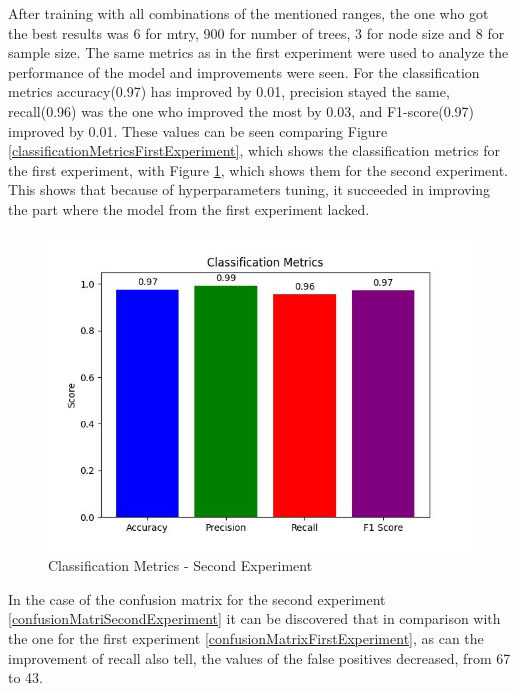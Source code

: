 After training with all combinations of the mentioned ranges, the one who got the best results was 6 for mtry, 900 for number of trees, 3 for node size and 8 for sample size. The same metrics as in the first experiment were used to analyze the performance of the model and improvements were seen. For the classification metrics accuracy(0.97) has improved by 0.01, precision stayed the same, recall(0.96) was the one who improved the most by 0.03, and F1-score(0.97) improved by 0.01. These values can be seen comparing Figure \ref{classificationMetricsFirstExperiment}, which shows the classification metrics for the first experiment, with Figure \ref{classificationMetricsSecondExperiment}, which shows them for the second experiment. This shows that because of hyperparameters tuning, it succeeded in improving the part where the model from the first experiment lacked.

\begin{figure}[htbp]
	\centering
		\includegraphics[scale=0.8]{LaTeX Bachelor Thesis Depression Signs Detection/figures/metrics/experiment2English/classificationMetrics.jpg}
	\caption{Classification Metrics - Second Experiment}
	\label{classificationMetricsSecondExperiment}
\end{figure}

In the case of the confusion matrix for the second experiment \ref{confusionMatriSecondExperiment} it can be discovered that in comparison with the one for the first experiment \ref{confusionMatrixFirstExperiment}, as can the improvement of recall also tell, the values of the false positives decreased, from 67 to 43.

